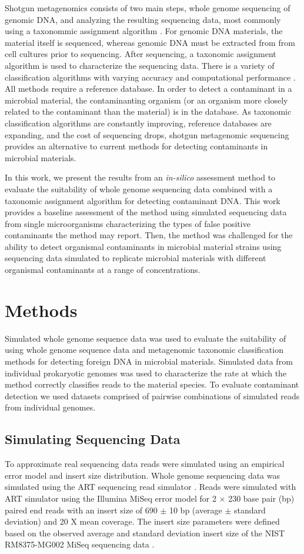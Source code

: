 \documentclass[fleqn,10pt,lineno]{wlpeerj}\usepackage[]{graphicx}\usepackage[]{color}
\begin{document}
Shotgun metagenomics consists of two main steps, whole genome sequencing of genomic DNA, and analyzing the resulting sequencing data, most commonly using a taxonommic assignment algorithm \citep{Thomas2012}. 
For genomic DNA materials, the material itself is sequenced, whereas genomic DNA must be extracted from from cell cultures prior to sequencing. 
After sequencing, a taxonomic assignment algorithm is used to characterize the sequencing data. 
There is a variety of classification algorithms with varying accuracy and computational performance \citep{Bazinet2012,menzel2016fast}.
All methods require a reference database.
In order to detect a contaminant in a microbial material, the contaminanting organism (or an organism more closely related to the contaminant than the material) is in the database. 
As taxonomic classification algorithms are constantly improving, reference databases are expanding, and the cost of sequencing drops, shotgun metagenomic sequencing provides an alternative to current methods for detecting contaminants in microbial materials.

In this work, we present the results from an \textit{in-silico} assessment method to evaluate the suitability of whole genome sequencing data combined with a taxonomic assignment algorithm for detecting contaminant DNA.
This work provides a baseline assessment of the method using simulated sequencing data from single microorganisms characterizing the types of false positive contaminants the method may report.
Then, the method was challenged for the ability to detect organismal contaminants in microbial material strains using sequencing data simulated to replicate microbial materials with different organismal contaminants at a range of concentrations.

\section*{Methods}
Simulated whole genome sequence data was used to evaluate the suitability of using whole genome sequence data and metagenomic taxonomic classification methods for detecting foreign DNA in microbial materials.
Simulated data from individual prokaryotic genomes was used to characterize the rate at which the method correctly classifies reads to the material species.
To evaluate contaminant detection we used datasets comprised of pairwise combinations of simulated reads from individual genomes.  

\subsection*{Simulating Sequencing Data}
To approximate real sequencing data reads were simulated using an empirical error model and insert size distribution.
Whole genome sequencing data was simulated using the ART sequencing read simulator \citep{Huang2012}.
Reads were simulated with ART simulator using the Illumina MiSeq error model for 2 $\times$ 230 base pair (bp) paired end reads with an insert size of 690 $\pm$ 10 bp (average $\pm$ standard deviation) and 20 X mean coverage.
The insert size parameters were defined based on the observed average and standard deviation insert size of the NIST RM8375-MG002 MiSeq sequencing data \citep{olson2016pepr}.
\end{document}
